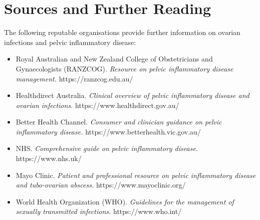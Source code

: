 \section*{Sources and Further Reading}
The following reputable organisations provide further information on ovarian infections and pelvic inflammatory disease:
\begin{itemize}
    \item Royal Australian and New Zealand College of Obstetricians and Gynaecologists (RANZCOG). \textit{Resource on pelvic inflammatory disease management.} https://ranzcog.edu.au/
    \item Healthdirect Australia. \textit{Clinical overview of pelvic inflammatory disease and ovarian infections.} https://www.healthdirect.gov.au/
    \item Better Health Channel. \textit{Consumer and clinician guidance on pelvic inflammatory disease.} https://www.betterhealth.vic.gov.au/
    \item NHS. \textit{Comprehensive guide on pelvic inflammatory disease.} https://www.nhs.uk/
    \item Mayo Clinic. \textit{Patient and professional resource on pelvic inflammatory disease and tubo-ovarian abscess.} https://www.mayoclinic.org/
    \item World Health Organization (WHO). \textit{Guidelines for the management of sexually transmitted infections.} https://www.who.int/
\end{itemize}
